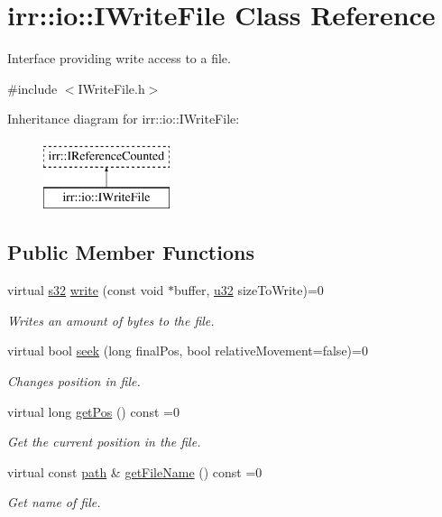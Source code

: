 \hypertarget{classirr_1_1io_1_1IWriteFile}{}\section{irr\+:\+:io\+:\+:I\+Write\+File Class Reference}
\label{classirr_1_1io_1_1IWriteFile}


Interface providing write access to a file.  




{\ttfamily \#include $<$I\+Write\+File.\+h$>$}

Inheritance diagram for irr\+:\+:io\+:\+:I\+Write\+File\+:\begin{figure}[H]
\begin{center}
\leavevmode
\includegraphics[height=2.000000cm]{classirr_1_1io_1_1IWriteFile}
\end{center}
\end{figure}
\subsection*{Public Member Functions}
\begin{DoxyCompactItemize}
\item 
virtual \hyperlink{namespaceirr_ac66849b7a6ed16e30ebede579f9b47c6}{s32} \hyperlink{classirr_1_1io_1_1IWriteFile_a32ce2fb186c4a21fcf3c85adb13c7c77}{write} (const void $\ast$buffer, \hyperlink{namespaceirr_a0416a53257075833e7002efd0a18e804}{u32} size\+To\+Write)=0
\begin{DoxyCompactList}\small\item\em Writes an amount of bytes to the file. \end{DoxyCompactList}\item 
virtual bool \hyperlink{classirr_1_1io_1_1IWriteFile_ad68289024b2a2079fce20ca9b95c9519}{seek} (long final\+Pos, bool relative\+Movement=false)=0
\begin{DoxyCompactList}\small\item\em Changes position in file. \end{DoxyCompactList}\item 
virtual long \hyperlink{classirr_1_1io_1_1IWriteFile_af9936d936c2df2d0069ca29697a2613c}{get\+Pos} () const  =0
\begin{DoxyCompactList}\small\item\em Get the current position in the file. \end{DoxyCompactList}\item 
virtual const \hyperlink{namespaceirr_1_1io_ab1bdc45edb3f94d8319c02bc0f840ee1}{path} \& \hyperlink{classirr_1_1io_1_1IWriteFile_a9339e386044eed2d3f7cd5fad6957d37}{get\+File\+Name} () const  =0
\begin{DoxyCompactList}\small\item\em Get name of file. \end{DoxyCompactList}\end{DoxyCompactItemize}
